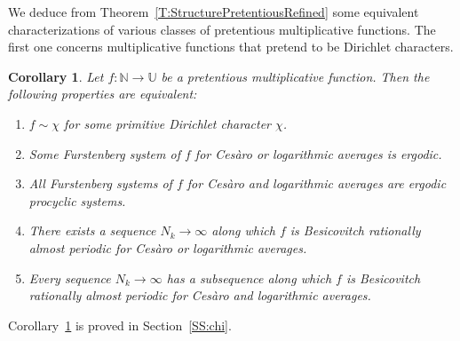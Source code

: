 \documentclass[11pt]{amsart}
\newtheorem{corollary}[lemma]{Corollary}
\theoremstyle{definition}
\newcommand{\N}{{\mathbb N}}
\newcommand{\R}{{\mathbb R}}
\newcommand{\U}{{\mathbb U}}
\begin{document}
We deduce from Theorem~\ref{T:StructurePretentiousRefined} some equivalent characterizations of   various classes  of pretentious multiplicative functions. The first one concerns  multiplicative functions that pretend to be Dirichlet characters.
\begin{corollary}\label{C:chi}
	Let $f\colon \N\to \U$ be a pretentious multiplicative function. Then the following properties are equivalent:
	\begin{enumerate}
		\item\label{I:chi1} $f\sim \chi$ for some primitive Dirichlet character $\chi$.
		
		\smallskip
		
		\item\label{I:chi2}  Some Furstenberg system of  	$f$ for Ces\`aro  or logarithmic averages is ergodic.
		
		\smallskip
		
		\item\label{I:chi3}  All Furstenberg systems of  	$f$ for Ces\`aro  and logarithmic averages are ergodic procyclic systems.
		
		\smallskip
		
			\item\label{I:chi4}  There exists a sequence $N_k\to\infty$ along which $f$ is 	Besicovitch rationally almost periodic for Ces\`aro or logarithmic averages.
			
			\smallskip
			
				\item\label{I:chi5}  	Every sequence $N_k\to\infty$ has a subsequence along which $f$ is Besicovitch rationally almost periodic  for Ces\`aro and logarithmic averages.			
	\end{enumerate}
\end{corollary}
Corollary~\ref{C:chi} is proved in Section~\ref{SS:chi}.
\end{document}
